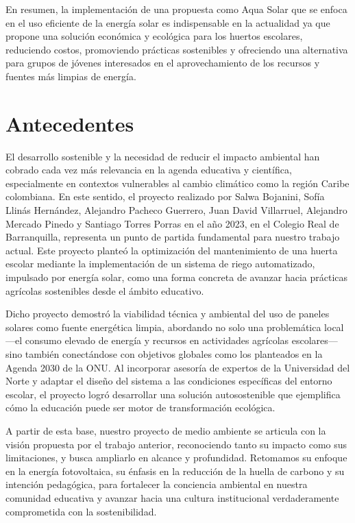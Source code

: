 \documentclass[12pt]{article}
\begin{document}
En resumen, la implementación de una propuesta como Aqua Solar que se enfoca en el uso eficiente de la energía solar es indispensable en la actualidad ya que propone una solución económica y ecológica para los huertos escolares, reduciendo costos, promoviendo prácticas sostenibles y ofreciendo una alternativa para grupos de jóvenes interesados en el aprovechamiento de los recursos y fuentes más limpias de energía.
\newpage
\section{Antecedentes}
El desarrollo sostenible y la necesidad de reducir el impacto ambiental han cobrado cada vez más relevancia en la agenda educativa y científica, especialmente en contextos vulnerables al cambio climático como la región Caribe colombiana. En este sentido, el proyecto realizado por Salwa Bojanini, Sofía Llinás Hernández, Alejandro Pacheco Guerrero, Juan David Villarruel, Alejandro Mercado Pinedo y Santiago Torres Porras en el año 2023, en el Colegio Real de Barranquilla, representa un punto de partida fundamental para nuestro trabajo actual. Este proyecto planteó la optimización del mantenimiento de una huerta escolar mediante la implementación de un sistema de riego automatizado, impulsado por energía solar, como una forma concreta de avanzar hacia prácticas agrícolas sostenibles desde el ámbito educativo.

Dicho proyecto demostró la viabilidad técnica y ambiental del uso de paneles solares como fuente energética limpia, abordando no solo una problemática local —el consumo elevado de energía y recursos en actividades agrícolas escolares— sino también conectándose con objetivos globales como los planteados en la Agenda 2030 de la ONU. Al incorporar asesoría de expertos de la Universidad del Norte y adaptar el diseño del sistema a las condiciones específicas del entorno escolar, el proyecto logró desarrollar una solución autosostenible que ejemplifica cómo la educación puede ser motor de transformación ecológica.

A partir de esta base, nuestro proyecto de medio ambiente se articula con la visión propuesta por el trabajo anterior, reconociendo tanto su impacto como sus limitaciones, y busca ampliarlo en alcance y profundidad. Retomamos su enfoque en la energía fotovoltaica, su énfasis en la reducción de la huella de carbono y su intención pedagógica, para fortalecer la conciencia ambiental en nuestra comunidad educativa y avanzar hacia una cultura institucional verdaderamente comprometida con la sostenibilidad.
\end{document}
